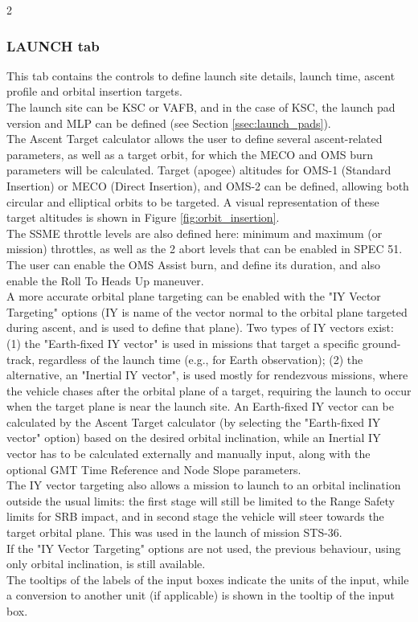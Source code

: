 \documentclass[Space_Shuttle_Vessel_Manual.tex]{subfiles}
\begin{document}
\begin{multicols*}{2}
\subsubsection{LAUNCH tab}
This tab contains the controls to define launch site details, launch time, ascent profile and orbital insertion targets.\\
The launch site can be KSC or VAFB, and in the case of KSC, the launch pad version and MLP can be defined (see Section \ref{ssec:launch_pads}).\\
The Ascent Target calculator allows the user to define several ascent-related parameters, as well as a target orbit, for which the MECO and OMS burn parameters will be calculated. Target (apogee) altitudes for OMS-1 (Standard Insertion) or MECO (Direct Insertion), and OMS-2 can be defined, allowing both circular and elliptical orbits to be targeted. A visual representation of these target altitudes is shown in Figure \ref{fig:orbit_insertion}.\\
The SSME throttle levels are also defined here: minimum and maximum (or mission) throttles, as well as the 2 abort levels that can be enabled in SPEC 51.\\
The user can enable the OMS Assist burn, and define its duration, and also enable the Roll To Heads Up maneuver.\\
A more accurate orbital plane targeting can be enabled with the "IY Vector Targeting" options (IY is name of the vector normal to the orbital plane targeted during ascent, and is used to define that plane). Two types of IY vectors exist: (1) the "Earth-fixed IY vector" is used in missions that target a specific ground-track, regardless of the launch time (e.g., for Earth observation); (2) the alternative, an "Inertial IY vector", is used mostly for rendezvous missions, where the vehicle chases after the orbital plane of a target, requiring the launch to occur when the target plane is near the launch site. An Earth-fixed IY vector can be calculated by the Ascent Target calculator (by selecting the "Earth-fixed IY vector" option) based on the desired orbital inclination, while an Inertial IY vector has to be calculated externally and manually input, along with the optional GMT Time Reference and Node Slope parameters.\\
The IY vector targeting also allows a mission to launch to an orbital inclination outside the usual limits: the first stage will still be limited to the Range Safety limits for SRB impact, and in second stage the vehicle will steer towards the target orbital plane. This was used in the launch of mission STS-36.\\
If the "IY Vector Targeting" options are not used, the previous behaviour, using only orbital inclination, is still available.\\
The tooltips of the labels of the input boxes indicate the units of the input, while a conversion to another unit (if applicable) is shown in the tooltip of the input box.


\end{multicols*}
\end{document}
